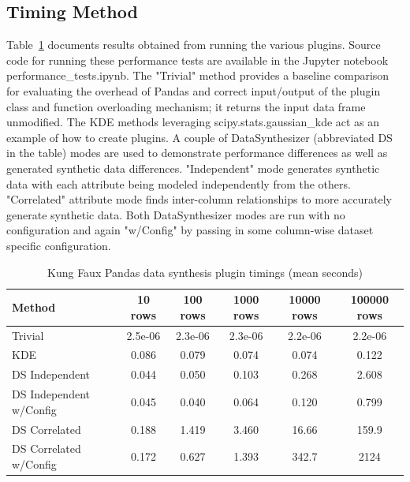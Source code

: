 \documentclass{amia}
\begin{document}
\subsection{Timing Method}

Table~\ref{timing_results} documents results obtained from running the various plugins. Source code for running these performance tests are available in the Jupyter notebook performance\_tests.ipynb. The "Trivial" method provides a baseline comparison for evaluating the overhead of Pandas and correct input/output of the plugin class and function overloading mechanism; it returns the input data frame unmodified. The KDE methods leveraging scipy.stats.gaussian\_kde act as an example of how to create plugins. A couple of DataSynthesizer (abbreviated DS in the table) modes are used to demonstrate performance differences as well as generated synthetic data differences. "Independent" mode generates synthetic data with each attribute being modeled independently from the others. "Correlated" attribute mode finds inter-column relationships to more accurately generate synthetic data. Both DataSynthesizer modes are run with no configuration and again "w/Config" by passing in some column-wise dataset specific configuration.

\begin{table}
	\caption{Kung Faux Pandas data synthesis plugin timings (mean seconds)}
	\label{timing_results}
	\centering
	\begin{tabular}{l c c c c c}
		\toprule 
		Method & 10 rows & 100 rows & 1000 rows & 10000 rows & 100000 rows\\ 
		\midrule 
		Trivial & 2.5e-06 & 2.3e-06 & 2.3e-06 & 2.2e-06 & 2.2e-06 \\ 
		KDE & 0.086 & 0.079 & 0.074 & 0.074 & 0.122 \\ 
		DS Independent & 0.044 & 0.050 & 0.103 & 0.268 & 2.608 \\ 
		DS Independent w/Config & 0.045 & 0.040 & 0.064 & 0.120 & 0.799 \\
		DS Correlated & 0.188 & 1.419 & 3.460 & 16.66 & 159.9 \\ 
		DS Correlated w/Config & 0.172 & 0.627 & 1.393 & 342.7 & 2124 \\ 
		\midrule
	\end{tabular}
\end{table}
\end{document}
